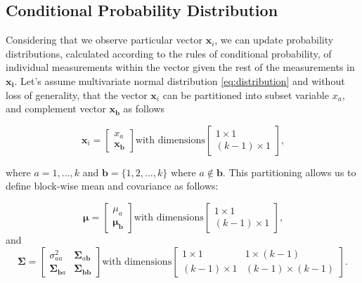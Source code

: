 \subsection{Conditional Probability Distribution}\label{AA:Conditional}
Considering that we observe particular vector $\boldsymbol{x}_i$, we can update probability distributions, calculated according to the rules of conditional probability, of individual measurements within the vector given the rest of the measurements in $\boldsymbol{x_{i}}$.
Let's assume multivariate normal distribution \eqref{eq:distribution} and without loss of generality, that the vector $\boldsymbol{x}_i$ can be partitioned into subset variable $x_a$, and complement vector $\boldsymbol{x_b}$ as follows

\begin{equation}
 \boldsymbol{x}_i = \begin{bmatrix}x_a \\ \boldsymbol{x_b} \end{bmatrix} \text{with dimensions} \begin{bmatrix}1\times 1 \\ (k - 1) \times 1\end{bmatrix} \text{,}
\end{equation}

where $a = 1,...,k$ and $\boldsymbol{b} = \{1, 2, \ldots, k\} \text{ where }a \notin \boldsymbol{b}$. This partitioning allows us to define block-wise mean and covariance as follows:

\begin{equation}
 \boldsymbol\mu = \begin{bmatrix}\mu_a \\ \boldsymbol{\mu_b} \end{bmatrix} \text{with dimensions} \begin{bmatrix}1\times 1 \\ (k - 1) \times 1\end{bmatrix} \text{,}
\end{equation}
and
\begin{equation}
 \boldsymbol\Sigma = \begin{bmatrix}\sigma_{aa}^2 & \boldsymbol\Sigma_{a\boldsymbol{b}} \\ \boldsymbol\Sigma_{\boldsymbol{b}a} & \boldsymbol\Sigma_{\boldsymbol{bb}} \end{bmatrix}
 \text{with dimensions} \begin{bmatrix}1\times 1 & 1\times (k - 1) \\ (k - 1) \times 1 & (k - 1) \times (k - 1)\end{bmatrix} \text{.} \label{eq:sigma}
\end{equation}


